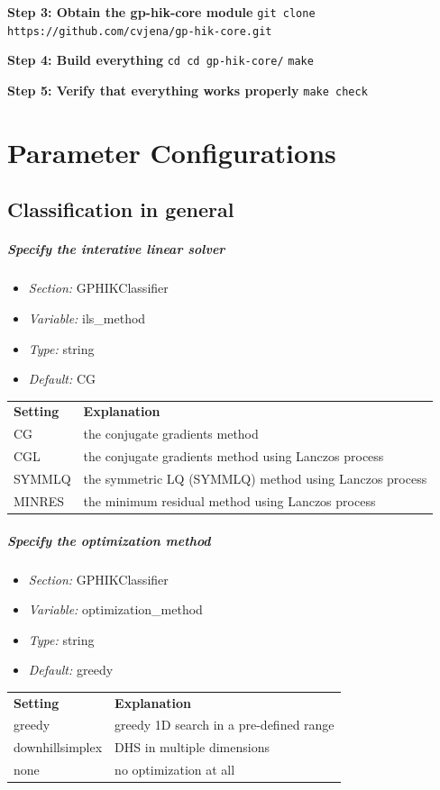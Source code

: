 \documentclass[a4paper]{scrreprt}
\newcommand{\confSection}[1]{\textit{Section: } #1}
\newcommand{\variable}[1]{\textit{Variable: } #1}
\newcommand{\variableType}[1]{\textit{Type: } #1}
\newcommand{\default}[1]{\textit{Default: } #1}
\newcommand{\infos}[4]{
	\begin{itemize}
	  \setlength{\itemsep}{-0.5em}
	  \item \confSection{#1}
	  \item \variable{#2}
	  \item \variableType{#3}
	  \item \default{#4}
	\end{itemize}
     }
\begin{document}
\textbf{Step 3: Obtain the gp-hik-core module}\newline
\texttt{git clone https://github.com/cvjena/gp-hik-core.git}
\vspace{2em}

\textbf{Step 4: Build everything}\newline
\texttt{cd cd gp-hik-core/} \newline
\texttt{make}
\vspace{2em}

\textbf{Step 5: Verify that everything works properly}\newline
\texttt{make check}



\chapter{Parameter Configurations}
\label{chap:ParamConfig}

\section{Classification in general}
  \paragraph{Specify the interative linear solver}
    \infos{GPHIKClassifier}{ils\_method}{string}{CG}
    \begin{tabular}{ll}
      \textbf{Setting} & \textbf{Explanation} \\
	CG     &  the conjugate gradients method\\
	CGL    &  the conjugate gradients method using Lanczos process \\
	SYMMLQ &  the symmetric LQ (SYMMLQ) method using Lanczos process\\
	MINRES &  the minimum residual method using Lanczos process \\
    \end{tabular}

  \paragraph{Specify the optimization method}
    \infos{GPHIKClassifier}{optimization\_method}{string}{greedy}
    \begin{tabular}{ll}
      \textbf{Setting} & \textbf{Explanation} \\
	greedy            &  greedy 1D search in a pre-defined range\\
	downhillsimplex   &  DHS in multiple dimensions \\
	none              &  no optimization at all\\
    \end{tabular}
\end{document}
